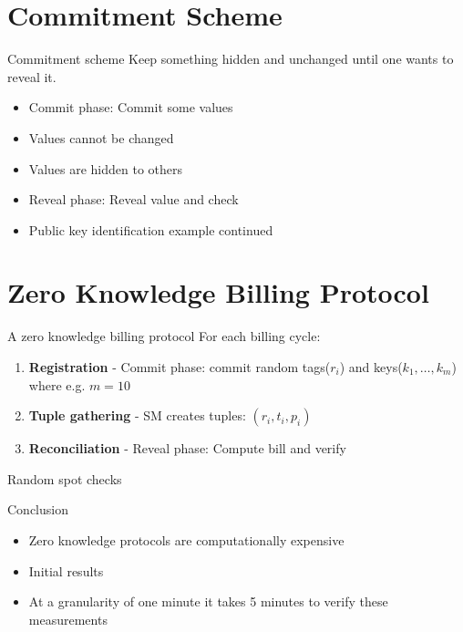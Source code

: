 \documentclass[10pt]{beamer}
\begin{document}
\section{Commitment Scheme}
\begin{frame}{Commitment scheme}
  Keep something hidden and unchanged until one wants to reveal it.
  \begin{itemize}
  \item Commit phase: Commit some values
  \item Values cannot be changed
  \item Values are hidden to others
  \item Reveal phase: Reveal value and check
  \item Public key identification example continued
  \end{itemize}
\end{frame}

\section{Zero Knowledge Billing Protocol}
\begin{frame}{A zero knowledge billing protocol}
  For each billing cycle:
  \begin{enumerate}
  \item \textbf{Registration} - Commit phase: commit random tags($r_i$) and keys($k_1, \dots, k_m$) where e.g. $m = 10$
  \item \textbf{Tuple gathering} - SM creates tuples: $(r_i, t_i, p_i)$
  \item \textbf{Reconciliation} - Reveal phase: Compute bill and verify
  \end{enumerate}
  Random spot checks
\end{frame}

\begin{frame}{Conclusion}
  \begin{itemize}
  \item Zero knowledge protocols are computationally expensive
  \item Initial results
  \item At a granularity of one minute it takes 5 minutes to verify these measurements
  \end{itemize}
\end{frame}

{\aauwavesbg
\begin{frame}
\end{frame}}
\end{document}
